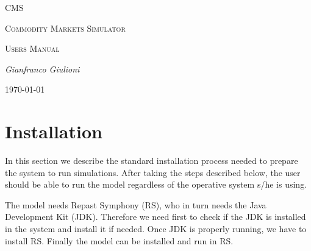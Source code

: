 \documentclass{article}
\begin{document}
\begin{titlepage}

	\begin{center}
	{\color{blue}\scshape\Huge CMS \par}
	\end{center}

	\vspace{2cm}

	\noindent
	{\color{blue}\scshape\Huge C}{\scshape\LARGE ommodity} 
	{\color{blue}\scshape\Huge M}{\scshape\LARGE arkets} 
	{\color{blue}\scshape\Huge S}{\scshape\LARGE imulator}\\

 
	
	\vspace{1.5cm}
	\noindent
	{\scshape\Huge Users Manual \par}

	\vspace{2cm}
	\noindent
	{\Large\itshape Gianfranco Giulioni\par}
	\vfill

	{\large \today\par}
\end{titlepage}

\newpage
\thispagestyle{empty}

\null


\tableofcontents
 

\newpage






\printglossaries

\newpage

\section{Installation}

In this section we describe the standard installation process needed to prepare the system to run simulations. After taking the steps described below, the user should be able to run the model regardless of the operative system s/he is using.

The model needs Repast Symphony (RS), who in turn needs the Java Development Kit (JDK). Therefore we need first to check if the JDK is installed in the system and install it if needed. Once JDK is properly running, we have to install RS. Finally the model can be installed and run in RS.
\end{document}
